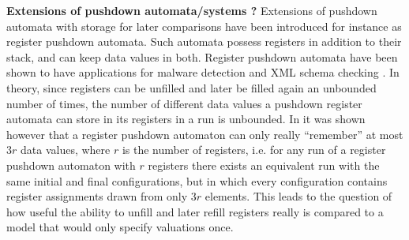 \documentclass[a4paper,UKenglish,cleveref, autoref, thm-restate]{lipics-v2021}
\begin{document}
{\bf Extensions of  pushdown automata/systems ?}
Extensions of pushdown automata with storage for later comparisons
have been introduced for instance as register pushdown automata. 
Such automata possess registers in addition to their stack, and can keep data values in both.
Register pushdown automata have been shown to have applications for malware detection and XML schema checking \cite{senda2021forward, senda2021ltl}. 
In theory, since registers can be unfilled and later be filled again an unbounded number of times, the number of different data values a pushdown register automata can store in its registers in a run is unbounded.  
In \cite{murawski2017reachability} it was shown however that a register pushdown automaton can
only really ``remember'' at most  $3r$ data values, where $r$ is the number of registers,
i.e. for any run of a register pushdown automaton with $r$ registers there exists an equivalent run %
 with the same initial and final conﬁgurations, but in which every configuration contains register assignments drawn from only $3r$ elements. This 
 leads to
 the
  question
  of
   how useful the ability to unfill and later refill registers really is compared to a model that would only specify valuations once.



%
\end{document}
